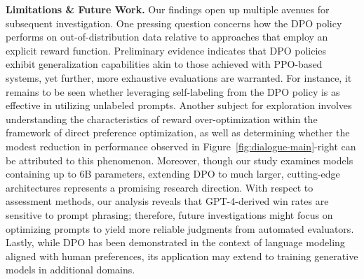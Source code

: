 \textbf{Limitations \& Future Work.} Our findings open up multiple avenues for subsequent investigation. One pressing question concerns how the DPO policy performs on out-of-distribution data relative to approaches that employ an explicit reward function. Preliminary evidence indicates that DPO policies exhibit generalization capabilities akin to those achieved with PPO-based systems, yet further, more exhaustive evaluations are warranted. For instance, it remains to be seen whether leveraging self-labeling from the DPO policy is as effective in utilizing unlabeled prompts. Another subject for exploration involves understanding the characteristics of reward over-optimization within the framework of direct preference optimization, as well as determining whether the modest reduction in performance observed in Figure~\ref{fig:dialogue-main}-right can be attributed to this phenomenon. Moreover, though our study examines models containing up to 6B parameters, extending DPO to much larger, cutting-edge architectures represents a promising research direction. With respect to assessment methods, our analysis reveals that GPT-4-derived win rates are sensitive to prompt phrasing; therefore, future investigations might focus on optimizing prompts to yield more reliable judgments from automated evaluators. Lastly, while DPO has been demonstrated in the context of language modeling aligned with human preferences, its application may extend to training generative models in additional domains.

